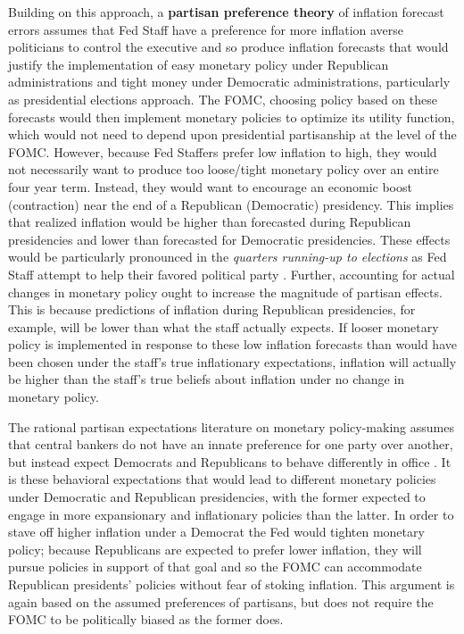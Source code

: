 \documentclass[a4paper]{article}
\begin{document}
Building on this approach, a {\bf{partisan preference theory}} of inflation forecast errors assumes that Fed Staff have a preference for more inflation averse politicians to control the executive and so produce inflation forecasts that would justify the implementation of easy monetary policy under Republican administrations and tight money under Democratic administrations, particularly as presidential elections approach. The FOMC, choosing policy based on these forecasts would then implement monetary policies to optimize its utility function, which would not need to depend upon presidential partisanship at the level of the FOMC. However, because Fed Staffers prefer low inflation to high, they would not necessarily want to produce too loose/tight monetary policy over an entire four year term. Instead, they would want to encourage an economic boost (contraction) near the end of a Republican (Democratic) presidency. This implies that realized inflation would be higher than forecasted during Republican presidencies and lower than forecasted for Democratic presidencies. These effects would be particularly pronounced in the {\emph{quarters running-up to elections}} as Fed Staff attempt to help their favored political party \citep{Beck1987,Grier1987}. Further, accounting for actual changes in monetary policy ought to increase the magnitude of partisan effects. This is because predictions of inflation during Republican presidencies, for example, will be lower than what the staff actually expects. If looser monetary policy is implemented in response to these low inflation forecasts than would have been chosen under the staff's true inflationary expectations, inflation will actually be higher than the staff's true beliefs about inflation under no change in monetary policy.

The rational partisan expectations literature on monetary policy-making assumes that central bankers do not have an innate preference for one party over another, but instead expect Democrats and Republicans to behave differently in office \citep{Alesina1991,Hibbs1994}. It is these behavioral expectations that would lead to different monetary policies under Democratic and Republican presidencies, with the former expected to engage in more expansionary and inflationary policies than the latter. In order to stave off higher inflation under a Democrat the Fed would tighten monetary policy; because Republicans are expected to prefer lower inflation, they will pursue policies in support of that goal and so the FOMC can accommodate Republican presidents' policies without fear of stoking inflation. This argument is again based on the assumed preferences of partisans, but does not require the FOMC to be politically biased as the former does. 
\end{document}
